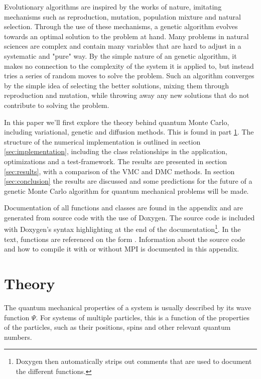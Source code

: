 \documentclass[aps,prb,twocolumn,floatfix]{revtex4}
\newcommand{\class}[1]{{\sffamily{#1}}}
\begin{document}
Evolutionary algorithms are inspired by the works of nature, imitating mechanisms such as reproduction, mutation, population mixture and natural selection. Through the use of these mechanisms, a genetic algorithm evolves towards an optimal solution to the problem at hand. Many problems in natural sciences are complex and contain many variables that are hard to adjust in a systematic and "pure" way. By the simple nature of an genetic algorithm, it makes no connection to the complexity of the system it is applied to, but instead tries a series of random moves to solve the problem. Such an algorithm converges by the simple idea of selecting the better solutions, mixing them through reproduction and mutation, while throwing away any new solutions that do not contribute to solving the problem.

In this paper we'll first explore the theory behind quantum Monte Carlo, including variational, genetic and diffusion methods. This is found in part \ref{sec:theory}. The structure of the numerical implementation is outlined in section \ref{sec:implementation}, including the class relationships in the application, optimizations and a test-framework. The results are presented in section \ref{sec:results}, with a comparison of the VMC and DMC methods. In section \ref{sec:conclusion} the results are discussed and some predictions for the future of a genetic Monte Carlo algorithm for quantum mechanical problems will be made.

Documentation of all functions and classes are found in the appendix and are generated from source code with the use of Doxygen. The source code is included with Doxygen's syntax highlighting at the end of the documentation\footnote{Doxygen then automatically strips out comments that are used to document the different functions.}. In the text, functions are referenced on the form \class{ClassName::functionName()}. Information about the source code and how to compile it with or without MPI is documented in this appendix.


\section{Theory} \label{sec:theory}

The quantum mechanical properties of a system is usually described by its wave function $\Psi$. For systems of multiple particles, this is a function of the properties of the particles, such as their positions, spins and other relevant quantum numbers. 
\end{document}
